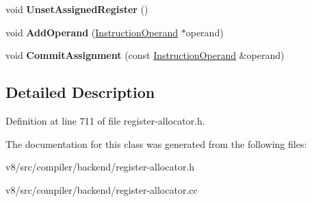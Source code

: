 \begin{DoxyCompactItemize}
void {\bfseries Unset\+Assigned\+Register} ()
\item 
\mbox{\label{classv8_1_1internal_1_1compiler_1_1RegisterAllocationData_1_1PhiMapValue_abfdd24f1b44b6c97b70eec1155b1788f}} 
void {\bfseries Add\+Operand} (\mbox{\hyperlink{classv8_1_1internal_1_1compiler_1_1InstructionOperand}{Instruction\+Operand}} $\ast$operand)
\item 
\mbox{\label{classv8_1_1internal_1_1compiler_1_1RegisterAllocationData_1_1PhiMapValue_a777606c6f3af77423c4e981f95a3e636}} 
void {\bfseries Commit\+Assignment} (const \mbox{\hyperlink{classv8_1_1internal_1_1compiler_1_1InstructionOperand}{Instruction\+Operand}} \&operand)
\end{DoxyCompactItemize}


\subsection{Detailed Description}


Definition at line 711 of file register-\/allocator.\+h.



The documentation for this class was generated from the following files\+:\begin{DoxyCompactItemize}
\item 
v8/src/compiler/backend/register-\/allocator.\+h\item 
v8/src/compiler/backend/register-\/allocator.\+cc\end{DoxyCompactItemize}
